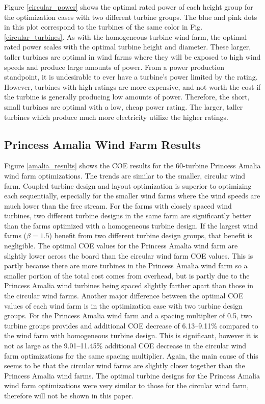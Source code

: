 \documentclass[wes, manuscript]{copernicus}
\begin{document}
Figure \ref{circular_power} shows the optimal rated power of each height group for the optimization cases with two different turbine groups. The blue and pink dots in this plot correspond to the turbines of the same color in Fig. \ref{circular_turbines}. As with the homogeneous turbine wind farm, the optimal rated power scales with the optimal turbine height and diameter. These larger, taller turbines are optimal in wind farms where they will be exposed to high wind speeds and produce large amounts of power. From a power production standpoint, it is undesirable to ever have a turbine's power limited by the rating. However, turbines with high ratings are more expensive, and not worth the cost if the turbine is generally producing low amounts of power. Therefore, the short, small turbines are optimal with a low, cheap power rating. The larger, taller turbines which produce much more electricity utilize the higher ratings.





\subsection{Princess Amalia Wind Farm Results}

Figure \ref{amalia_results} shows the COE results for the 60-turbine Princess Amalia wind farm optimizations.  The trends are similar to the smaller, circular wind farm. Coupled turbine design and layout optimization is superior to optimizing each sequentially, especially for the smaller wind farms where the wind speeds are much lower than the free stream. For the farms with closely spaced wind turbines, two different turbine designs in the same farm are significantly better than the farms optimized with a homogeneous turbine design. If the largest wind farms ($\beta=1.5$) benefit from two different turbine design groups, that benefit is negligible. The optimal COE values for the Princess Amalia wind farm are slightly lower across the board than the circular wind farm COE values. This is partly because there are more turbines in the Princess Amalia wind farm so a smaller portion of the total cost comes from overhead, but is partly due to the Princess Amalia wind turbines being spaced slightly farther apart than those in the circular wind farms. Another major difference between the optimal COE values of each wind farm is in the optimization case with two turbine design groups. For the Princess Amalia wind farm and a spacing multiplier of 0.5, two turbine groups provides and additional COE decrease of 6.13--9.11\% compared to the wind farm with homogeneous turbine design. This is significant, however it is not as large as the 9.01--11.45\% additional COE decrease in the circular wind farm optimizations for the same spacing multiplier. Again, the main cause of this seems to be that the circular wind farms are slightly closer together than the Princess Amalia wind farms.
The optimal turbine designs for the Princess Amalia wind farm optimizations were very similar to those for the circular wind farm, therefore will not be shown in this paper.
\end{document}
